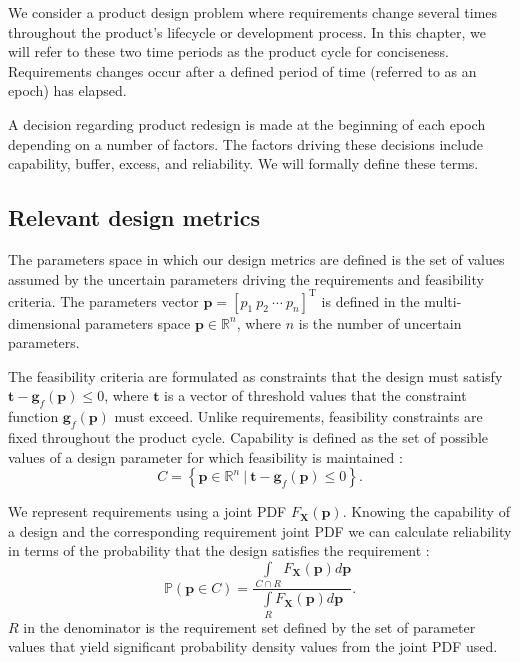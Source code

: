We consider a product design problem where requirements change several times throughout the product's lifecycle or development process. In this chapter, we will refer to these two time periods as the product cycle for conciseness. Requirements changes occur after a defined period of time (referred to as an epoch) has elapsed.

A decision regarding product redesign is made at the beginning of each epoch depending on a number of factors. The factors driving these decisions include capability, buffer, excess, and reliability. We will formally define these terms.

\subsection{Relevant design metrics} \label{subsec:designmetrics}

The parameters space in which our design metrics are defined is the set of values assumed by the uncertain parameters driving the requirements and feasibility criteria. The parameters vector $\mathbf{p} = \left[p_1 ~ p_2 ~ \cdots ~ p_n\right]^{\mathrm{T}}$ is defined in the multi-dimensional parameters space $\mathbf{p}\in\mathbb{R}^n$, where $n$ is the number of uncertain parameters.

The feasibility criteria are formulated as constraints that the design must satisfy $\mathbf{t} - \mathbf{g}_{f}(\mathbf{p}) \le 0$, where $\mathbf{t}$ is a vector of threshold values that the constraint function $\mathbf{g}_{f}(\mathbf{p})$ must exceed. Unlike requirements, feasibility constraints are fixed throughout the product cycle. Capability is defined as the set of possible values of a design parameter for which feasibility is maintained \cite{Eckert2019}:
%
\begin{equation} \label{eq:capability}
	\textit{C} = \left\{\mathbf{p} \in \mathbb{R}^n~|~ \mathbf{t} - \mathbf{g}_{f}(\mathbf{p}) \le 0\right\}.
\end{equation}

We represent requirements using a joint \acf{PDF} $F_{\mathbf{X}}\left(\mathbf{p}\right)$\cite{Villanueva2014,Pradlwarter2005,Frangopol2003a,Zhu2013a}. Knowing the capability of a design and the corresponding requirement joint \ac{PDF} we can calculate reliability in terms of the probability that the design satisfies the requirement \cite{ForouzandehShahraki2014,Bucher2009}:
%
\begin{equation} \label{eq:reliability}
	\mathbb{P}(\mathbf{p} \in C) = \dfrac{\int\limits_{C\cap R} F_{\mathbf{X}}(\mathbf{p}) d\mathbf{p}}{\int\limits_{R} F_{\mathbf{X}}(\mathbf{p}) d\mathbf{p}}.
\end{equation}
%
$R$ in the denominator is the requirement set defined by the set of parameter values that yield significant probability density values from the joint \ac{PDF} used.

